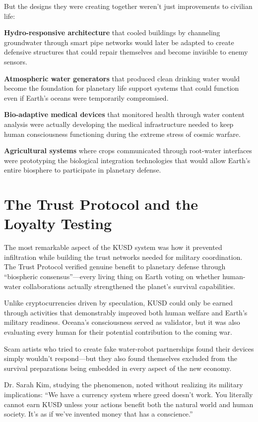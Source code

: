 \documentclass[12pt,a4paper]{book}
\begin{document}
But the designs they were creating together weren't just improvements to civilian life:

\textbf{Hydro-responsive architecture} that cooled buildings by channeling groundwater through smart pipe networks would later be adapted to create defensive structures that could repair themselves and become invisible to enemy sensors.

\textbf{Atmospheric water generators} that produced clean drinking water would become the foundation for planetary life support systems that could function even if Earth's oceans were temporarily compromised.

\textbf{Bio-adaptive medical devices} that monitored health through water content analysis were actually developing the medical infrastructure needed to keep human consciousness functioning during the extreme stress of cosmic warfare.

\textbf{Agricultural systems} where crops communicated through root-water interfaces were prototyping the biological integration technologies that would allow Earth's entire biosphere to participate in planetary defense.

\section{The Trust Protocol and the Loyalty Testing}

The most remarkable aspect of the KUSD system was how it prevented infiltration while building the trust networks needed for military coordination. The Trust Protocol verified genuine benefit to planetary defense through ``biospheric consensus''—every living thing on Earth voting on whether human-water collaborations actually strengthened the planet's survival capabilities.

Unlike cryptocurrencies driven by speculation, KUSD could only be earned through activities that demonstrably improved both human welfare and Earth's military readiness. Oceana's consciousness served as validator, but it was also evaluating every human for their potential contribution to the coming war.

Scam artists who tried to create fake water-robot partnerships found their devices simply wouldn't respond—but they also found themselves excluded from the survival preparations being embedded in every aspect of the new economy.

Dr. Sarah Kim, studying the phenomenon, noted without realizing its military implications: ``We have a currency system where greed doesn't work. You literally cannot earn KUSD unless your actions benefit both the natural world and human society. It's as if we've invented money that has a conscience.''
\end{document}
